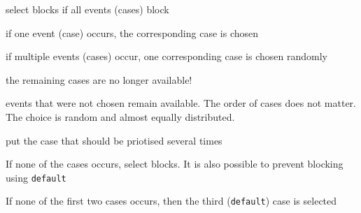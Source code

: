 \documentclass[landscape, a4paper]{article}
\begin{document}
\begin{minipage}[t]{0.2\linewidth}
\begin{betterlist}
		\adjustbox{scale=0.5}{
      \begin{dnumberedcodebox}[minted language=go,minted options={autogobble, fontsize=\small}, box align=top]
      select {
        case x = <-ch1:
            ...
        case y = <-ch2:
            ...
        case ch3 <- 1:
            ...
      }
      \end{dnumberedcodebox}
		}
		\item {}
		\begin{betterlist}
			\item select blocks if all events (cases) block
			\item if one event (case) occurs, the corresponding case is chosen
			\item if multiple events (cases) occur, one corresponding case is chosen randomly
			\item the remaining cases are no longer available!
		\end{betterlist}
		\item events that were not chosen remain available. The order of cases does not matter. The choice is random and almost equally distributed.
		\item {} put the case that should be priotised several times
		\item {}

		\adjustbox{scale=0.5}{
      \begin{dnumberedcodebox}[minted language=go,minted options={autogobble, fontsize=\small}, box align=top]
        select {
          case <-ch1:
          case ch2<-1:
          default:
        }
      \end{dnumberedcodebox}
		}
		\begin{betterlist}
			\item If none of the cases occurs, select blocks. It is also possible to prevent blocking using \texttt{default}
			\item If none of the first two cases occurs, then the third (\texttt{default}) case is selected
		\end{betterlist}
		\item {}


\end{betterlist}
\end{minipage}
\end{document}
